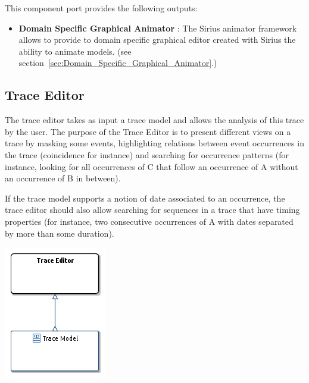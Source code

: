 \documentclass{gemoc} %
\begin{document}
This component port provides the following outputs:
\begin{itemize}
  \item \textbf{Domain Specific Graphical Animator} :
The Sirius animator framework allows to provide to domain specific graphical editor created with Sirius the ability to animate models.
(see section~\ref{sec:Domain_Specific_Graphical_Animator}.)
\end{itemize}



\subsection{Trace Editor}
\label{sec:Trace_Editor}
The trace editor takes as input a trace model and allows the analysis of this trace by the user.
The purpose of the Trace Editor is to present different views on a trace by masking some events, highlighting relations between event occurrences in the trace (coincidence for instance) and searching for occurrence patterns (for instance, looking for all occurrences of C that follow an occurrence of A without an occurrence of B in between).
 
If the trace model supports a notion of date associated to an occurrence, the trace editor should also allow searching for sequences in a trace that have timing properties (for instance, two consecutive occurrences of A with dates separated by more than some duration).
\begin{center}
\includegraphics*[trim=0.0cm 0.0cm 0cm 0.0cm, clip=true]{../images/generated/Generated_Trace_Editor.png}
\end{center}
\end{document}
